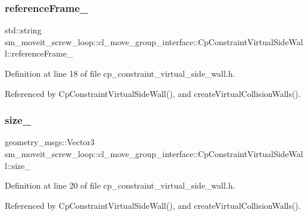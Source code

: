 \subsubsection{\texorpdfstring{reference\+Frame\+\_\+}{referenceFrame\_}}
{\footnotesize\ttfamily std\+::string sm\+\_\+moveit\+\_\+screw\+\_\+loop\+::cl\+\_\+move\+\_\+group\+\_\+interface\+::\+Cp\+Constraint\+Virtual\+Side\+Wall\+::reference\+Frame\+\_\+\hspace{0.3cm}{\ttfamily [private]}}



Definition at line 18 of file cp\+\_\+constraint\+\_\+virtual\+\_\+side\+\_\+wall.\+h.



Referenced by Cp\+Constraint\+Virtual\+Side\+Wall(), and create\+Virtual\+Collision\+Walls().

\mbox{\label{classsm__moveit__screw__loop_1_1cl__move__group__interface_1_1CpConstraintVirtualSideWall_a8426348ea8e4b58a66677f971355a87b}} 
\subsubsection{\texorpdfstring{size\+\_\+}{size\_}}
{\footnotesize\ttfamily geometry\+\_\+msgs\+::\+Vector3 sm\+\_\+moveit\+\_\+screw\+\_\+loop\+::cl\+\_\+move\+\_\+group\+\_\+interface\+::\+Cp\+Constraint\+Virtual\+Side\+Wall\+::size\+\_\+\hspace{0.3cm}{\ttfamily [private]}}



Definition at line 20 of file cp\+\_\+constraint\+\_\+virtual\+\_\+side\+\_\+wall.\+h.



Referenced by Cp\+Constraint\+Virtual\+Side\+Wall(), and create\+Virtual\+Collision\+Walls().



